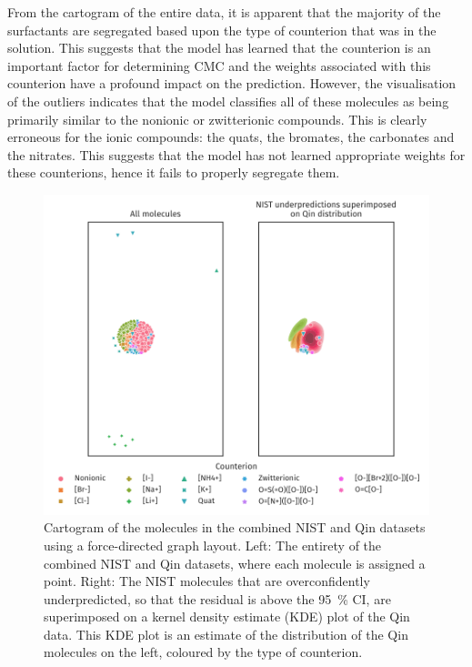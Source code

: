 From the cartogram of the entire data, it is apparent that the majority of the
surfactants are segregated based upon the type of counterion that was in the
solution. This suggests that the model has learned that the counterion is an
important factor for determining CMC and the weights associated with this
counterion have a profound impact on the prediction. However, the visualisation
of the outliers indicates that the model classifies all of these molecules as
being primarily similar to the nonionic or zwitterionic compounds. This is
clearly erroneous for the ionic compounds: the quats, the bromates, the
carbonates and the nitrates. This suggests that the model has not learned
appropriate weights for these counterions, hence it fails to properly segregate
them.

\begin{figure}
    \includegraphics[width=\textwidth]{images/force-graph.pdf}
    \caption{Cartogram of the molecules in the combined NIST and Qin datasets
        using a force-directed graph layout. Left: The entirety of the combined
        NIST and Qin datasets, where each molecule is assigned a point. Right:
        The NIST molecules that are overconfidently underpredicted, so that the
        residual is above the \SI{95}{\%} CI, are superimposed on a kernel
        density estimate (KDE) plot of the Qin data. This KDE plot is an
        estimate of the distribution of the Qin molecules on the left, coloured
        by the type of counterion.}
    \label{fig:fdg}
\end{figure}

